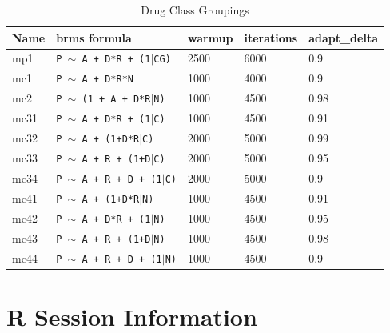 \documentclass[11pt,twoside]{article}
\numberwithin{Theorem}{section}
\numberwithin{Definition}{section}
\numberwithin{Lemma}{section}
\numberwithin{Algorithm}{section}
\numberwithin{equation}{section}
\begin{document}
\begin{table}[h!]
	\centering
	\begin{tabular}{|l|l|l|l|l|}
		\hline
		Name & brms formula & warmup & iterations & adapt\_delta \\ \hline 
		mp1 & \texttt{P $\sim$ A + D*R + (1$|$CG)} & 2500 & 6000 & 0.9 \\
		mc1 & \texttt{P $\sim$ A + D*R*N} & 1000 & 4000 & 0.9 \\ 
		mc2 & \texttt{P $\sim$ (1 + A + D*R$|$N)} & 1000 & 4500 & 0.98 \\
		mc31 & \texttt{P $\sim$ A + D*R + (1$|$C)} & 1000 & 4500 & 0.91 \\
		mc32 & \texttt{P $\sim$ A + (1+D*R$|$C)} & 2000 & 5000 & 0.99 \\
		mc33 & \texttt{P $\sim$ A + R + (1+D$|$C)} & 2000 & 5000 & 0.95 \\
		mc34 & \texttt{P $\sim$ A + R + D + (1$|$C)} & 2000 & 5000 & 0.9 \\
		mc41 & \texttt{P $\sim$ A + (1+D*R$|$N)} & 1000 & 4500 & 0.91 \\
		mc42 & \texttt{P $\sim$ A + D*R + (1$|$N)} & 1000 & 4500 & 0.95 \\
		mc43 & \texttt{P $\sim$ A + R + (1+D$|$N)} & 1000 & 4500 & 0.98 \\
		mc44 & \texttt{P $\sim$ A + R + D + (1$|$N)} & 1000 & 4500 & 0.9 \\ \hline
	\end{tabular} \caption{Drug Class Groupings}\label{table::appfullmod}
\end{table}


\clearpage

\section{R Session Information}
\label{app:two}
\end{document}
